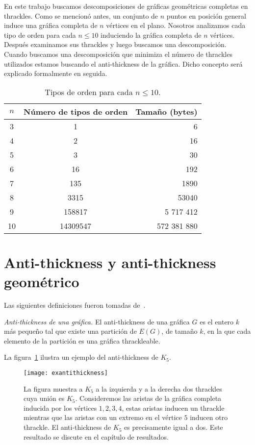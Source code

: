 En este trabajo buscamos descomposiciones de gráficas geométricas completas en
thrackles. Como se mencionó antes, un conjunto de $n$ puntos en posición general
induce una gráfica completa de $n$ vértices en el plano. Nosotros analizamos
cada tipo de orden para cada $n\leq 10$ induciendo la gráfica completa de $n$
vértices. Después examinamos sus thrackles y luego buscamos una descomposición.
Cuando buscamos una descomposición que minimiza el número de thrackles
utilizados estamos buscando el anti-thickness de la gráfica. Dicho concepto
será explicado formalmente en seguida.
\begin{table}[ht]
  \centering
  \begin{tabular}{|c|c|r|}
  \hline
  $n$ & Número de tipos de orden & Tamaño (bytes)   \\ \hline
  3     & 1                   & 6       \\ \hline
  4     & 2                   & 16      \\ \hline
  5     & 3                   & 30      \\ \hline
  6     & 16                  & 192     \\ \hline
  7     & 135                 & 1890    \\ \hline
  8     & 3315                & 53040   \\ \hline
  9     & 158817              &	5 717 412   \\\hline
  10    & 14309547            & 572 381 880 \\ \hline
  \end{tabular}
  \caption{Tipos de orden para cada $n\leq10$.}
  \label{tab:ots}
\end{table}

\section{Anti-thickness y anti-thickness geométrico}
Las siguientes definiciones fueron tomadas de~\cite{Dujmovic2017}.
\begin{definition}{\emph{Anti-thickness de una gráfica.}}
  El anti-thickness de una gráfica $G$ es el entero $k$ más pequeño tal que
  existe una partición de $E(G)$, de tamaño $k$, en la que cada elemento de la
  partición es una gráfica thrackleable.
\end{definition}
La figura~\ref{fig:exantithickness} ilustra un ejemplo del anti-thickness de
$K_5$.
\begin{figure}[htpb]
  \centering
  \texttt{[image: exantithickness]}
  \caption{La figura muestra a $K_5$ a la izquierda y a la derecha dos thrackles
  cuya unión es $K_5$. Consideremos las aristas de la gráfica completa inducida por los vértices $1,2,3,4$,
  estas aristas inducen un thrackle mientras que las aristas con un extremo en el vértice $5$ inducen otro thrackle.
  El anti-thickness de $K_5$ es precisamente igual a dos. Este resultado se discute en el capítulo de resultados.}
  \label{fig:exantithickness}
\end{figure}

